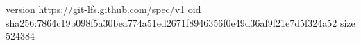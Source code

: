 version https://git-lfs.github.com/spec/v1
oid sha256:7864c19b098f5a30bea774a51ed2671f8946356f0e49d36af9f21e7d5f324a52
size 524384
